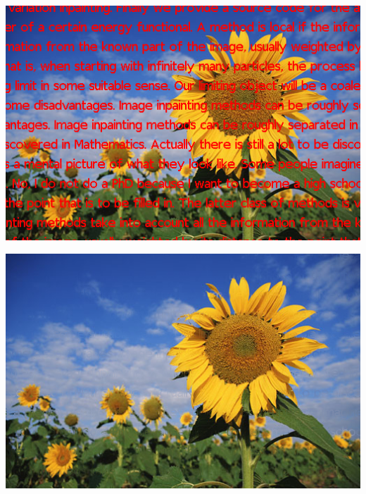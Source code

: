 \begin{frame}
{\begin{minipage}[t][0.25\textheight][t]{\textwidth}
\begin{minipage}{.3\textwidth}
\center
\includegraphics[scale=0.15]{figures/motivation/pock-sunflower-mask.png}
\end{minipage}
\begin{minipage}{.3\textwidth}
\center
\includegraphics[scale=0.15]{figures/motivation/pock-sunflower-inpainted.png}
\end{minipage}
\end{minipage}
}
%
\pause
%
\end{frame}
